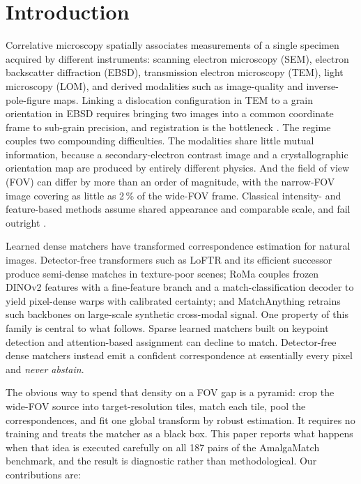 \documentclass[10pt]{article}
\begin{document}
\section{Introduction}

Correlative microscopy spatially associates measurements of a single specimen acquired by different instruments: scanning electron microscopy (SEM), electron backscatter diffraction (EBSD), transmission electron microscopy (TEM), light microscopy (LOM), and derived modalities such as image-quality and inverse-pole-figure maps. Linking a dislocation configuration in TEM to a grain orientation in EBSD requires bringing two images into a common coordinate frame to sub-grain precision, and registration is the bottleneck \citep{durmaz2026foundation}. The regime couples two compounding difficulties. The modalities share little mutual information, because a secondary-electron contrast image and a crystallographic orientation map are produced by entirely different physics. And the field of view (FOV) can differ by more than an order of magnitude, with the narrow-FOV image covering as little as 2\,\% of the wide-FOV frame. Classical intensity- and feature-based methods assume shared appearance and comparable scale, and fail outright \citep{durmaz2026amalgamatch}.

Learned dense matchers have transformed correspondence estimation for natural images. Detector-free transformers such as LoFTR \citep{sun2021loftr} and its efficient successor \citep{wang2024efficientloftr} produce semi-dense matches in texture-poor scenes; RoMa \citep{edstedt2024roma} couples frozen DINOv2 features \citep{oquab2024dinov2} with a fine-feature branch and a match-classification decoder to yield pixel-dense warps with calibrated certainty; and MatchAnything \citep{he2025matchanything} retrains such backbones on large-scale synthetic cross-modal signal. One property of this family is central to what follows. Sparse learned matchers built on keypoint detection and attention-based assignment \citep{sarlin2020superglue,lindenberger2023lightglue} can decline to match. Detector-free dense matchers instead emit a confident correspondence at essentially every pixel and \emph{never abstain}.

The obvious way to spend that density on a FOV gap is a pyramid: crop the wide-FOV source into target-resolution tiles, match each tile, pool the correspondences, and fit one global transform by robust estimation. It requires no training and treats the matcher as a black box. This paper reports what happens when that idea is executed carefully on all 187 pairs of the AmalgaMatch benchmark, and the result is diagnostic rather than methodological. Our contributions are:
\end{document}
